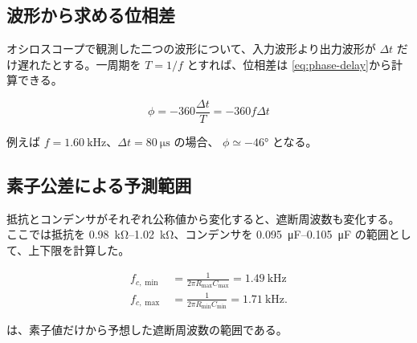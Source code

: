 


\subsection{波形から求める位相差}
\label{subsec:phase-measurement}

オシロスコープで観測した二つの波形について、入力波形より出力波形が
$\Delta t$ だけ遅れたとする。一周期を $T=1/f$ とすれば、位相差は
\cref{eq:phase-delay}から計算できる。

\begin{equation}
  \phi=-360\frac{\Delta t}{T}=-360f\Delta t
  \label{eq:phase-delay}
\end{equation}

例えば $f=\qty{1.60}{\kilo\hertz}$、$\Delta t=\qty{80}{\micro\second}$ の場合、
$\phi\simeq\ang{-46}$ となる。

\subsection{素子公差による予測範囲}
\label{subsec:tolerance-range}

抵抗とコンデンサがそれぞれ公称値から変化すると、遮断周波数も変化する。
ここでは抵抗を \qtyrange{0.98}{1.02}{\kilo\ohm}、コンデンサを
\qtyrange{0.095}{0.105}{\micro\farad} の範囲として、上下限を計算した。

\begin{align}
  f_{c,\min}
    &=\frac{1}{2\pi R_{\max}C_{\max}}
      =\qty{1.49}{\kilo\hertz}
      \label{eq:cutoff-min}\\
  f_{c,\max}
    &=\frac{1}{2\pi R_{\min}C_{\min}}
      =\qty{1.71}{\kilo\hertz}.
      \label{eq:cutoff-max}
\end{align}

は、素子値だけから予想した遮断周波数の範囲である。

